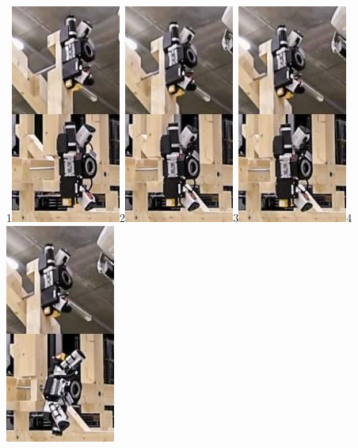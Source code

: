 \documentclass[11pt]{book}
\begin{document}
1\includegraphics[width=3.6cm,height=7.2cm]{./images/image102.jpeg}2\includegraphics[width=3.6cm,height=7.2cm]{./images/image103.jpeg}3\includegraphics[width=3.6cm,height=7.2cm]{./images/image104.jpeg}4\includegraphics[width=3.6cm,height=7.2cm]{./images/image105.jpeg}
\end{document}
